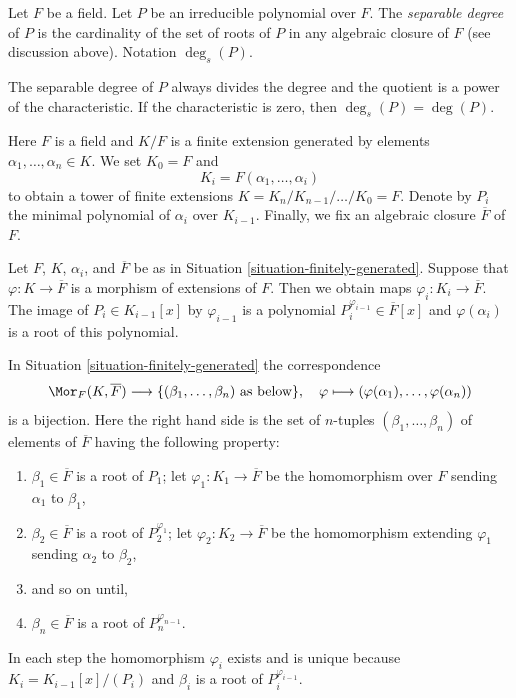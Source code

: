 \begin{definition}
\label{definition-separable-degree}
Let $F$ be a field. Let $P$ be an irreducible polynomial over $F$.
The {\it separable degree} of $P$ is the cardinality of the
set of roots of $P$ in any algebraic closure of $F$ (see discussion
above). Notation $\deg_s(P)$.
\end{definition}

\noindent
The separable degree of $P$ always divides the degree and the quotient
is a power of the characteristic. If the characteristic is zero, then
$\deg_s(P) = \deg(P)$.

\begin{situation}
\label{situation-finitely-generated}
Here $F$ is a field and $K/F$ is a finite extension generated by elements
$\alpha_1, \ldots, \alpha_n \in K$. We set $K_0 = F$ and
$$
K_i = F(\alpha_1, \ldots, \alpha_i)
$$
to obtain a tower of finite extensions
$K = K_n / K_{n - 1} / \ldots / K_0 = F$.
Denote by $P_i$ the minimal polynomial of $\alpha_i$ over $K_{i - 1}$.
Finally, we fix an algebraic closure $\overline{F}$ of $F$.
\end{situation}

\noindent
Let $F$, $K$, $\alpha_i$, and $\overline{F}$ be as in
Situation \ref{situation-finitely-generated}.
Suppose that $\varphi : K \to \overline{F}$ is a morphism of extensions
of $F$. Then we obtain maps $\varphi_i : K_i \to \overline{F}$.
The image of $P_i \in K_{i - 1}[x]$ by $\varphi_{i - 1}$
is a polynomial $P_i^{\varphi_{i - 1}} \in \overline{F}[x]$
and $\varphi(\alpha_i)$ is a root of this polynomial.

\begin{lemma}
\label{lemma-count-embeddings}
In Situation \ref{situation-finitely-generated} the correspondence
$$
\Mor_F(K, \overline{F})
\longrightarrow
\{(\beta_1, \ldots, \beta_n)\text{ as below}\},
\quad
\varphi \longmapsto (\varphi(\alpha_1), \ldots, \varphi(\alpha_n))
$$
is a bijection. Here the right hand side is the set of $n$-tuples
$(\beta_1, \ldots, \beta_n)$ of elements of $\overline{F}$ having
the following property:
\begin{enumerate}
\item $\beta_1 \in \overline{F}$ is a root of $P_1$;
let $\varphi_1 : K_1 \to \overline{F}$ be the homomorphism
over $F$ sending $\alpha_1$ to $\beta_1$,
\item $\beta_2 \in \overline{F}$ is a root of $P_2^{\varphi_1}$;
let $\varphi_2 : K_2 \to \overline{F}$ be the homomorphism
extending $\varphi_1$ sending $\alpha_2$ to $\beta_2$,
\item and so on until,
\item $\beta_n \in \overline{F}$ is a root of $P_n^{\varphi_{n - 1}}$.
\end{enumerate}
In each step the homomorphism $\varphi_i$ exists and is unique because
$K_i = K_{i - 1}[x]/(P_i)$ and $\beta_i$ is a root of $P_i^{\varphi_{i - 1}}$.
\end{lemma}


